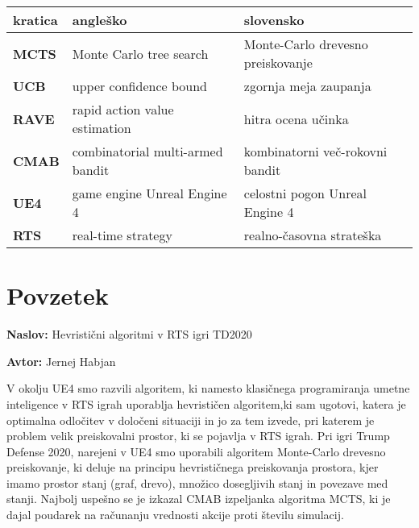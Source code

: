 \documentclass[a4paper, 12pt]{book}
\newcommand{\ttitle}{Hevristični algoritmi v RTS igri TD2020}
\newcommand{\tauthor}{Jernej Habjan}
\newcommand{\clearemptydoublepage}{\newpage{\pagestyle{empty}\cleardoublepage}}
\begin{document}
\begin{comment}
\begin{tabular}{l|l|l}
  {\bf kratica} & {\bf angleško} & {\bf slovensko} \\ \hline
  {\bf CA} & classification accuracy & klasifikacijska točnost \\
  {\bf DBMS} & database management system & sistem za upravljanje podatkovnih baz \\
  {\bf SVM} & support vector machine & metoda podpornih vektorjev \\
  \dots & \dots & \dots \\
\end{tabular}
\end{comment}

\noindent\begin{tabular}{p{}|p{}|p{}}    %
  {\bf kratica} & {\bf angleško}                             & {\bf slovensko} \\ \hline
  {\bf MCTS}      & Monte Carlo tree search               & Monte-Carlo drevesno preiskovanje \\
  {\bf UCB} & upper confidence bound & zgornja meja zaupanja \\
  {\bf RAVE} & rapid action value estimation & hitra ocena učinka \\
  {\bf CMAB} & combinatorial multi-armed bandit & kombinatorni več-rokovni bandit \\
   {\bf UE4} & game engine Unreal Engine 4 & celostni pogon Unreal Engine 4 \\
     {\bf RTS} & real-time strategy & realno-časovna strateška \\
  
  
\end{tabular}


\clearemptydoublepage

\chapter*{Povzetek}

\noindent\textbf{Naslov:} \ttitle
\bigskip

\noindent\textbf{Avtor:} \tauthor
\bigskip

\noindent V okolju UE4 smo razvili algoritem, ki namesto klasičnega programiranja umetne inteligence v RTS igrah uporablja hevrističen algoritem,ki sam ugotovi, katera je optimalna odločitev v določeni situaciji in jo za tem izvede, pri katerem je problem velik preiskovalni prostor, ki se pojavlja v RTS igrah.
Pri igri Trump Defense 2020, narejeni v UE4 smo uporabili algoritem Monte-Carlo drevesno preiskovanje, ki deluje na principu hevrističnega preiskovanja prostora, kjer imamo prostor stanj (graf, drevo), množico dosegljivih stanj in povezave med stanji.
Najbolj uspešno se je izkazal CMAB izpeljanka algoritma MCTS, ki je dajal poudarek na računanju vrednosti akcije proti številu simulacij.
\end{document}

